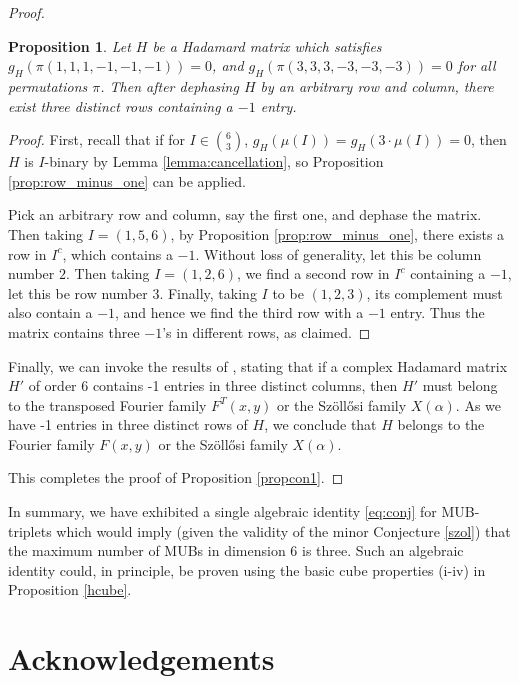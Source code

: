 \documentclass[12pt]{amsart}
\numberwithin{equation}{section}
\newcommand{\al}{\alpha}
\newtheorem{proposition}[fact]{Proposition}
\theoremstyle{definition}
\theoremstyle{remark}
\theoremstyle{remark}
\begin{document}
\begin{proof}
\begin{proposition}\label{tm1}
	Let $H$ be a Hadamard matrix which satisfies $g_H(\pi(1,1,1,-1,-1,-1))=0$, and
	$g_H(\pi(3,3,3,-3,-3,-3))=0$ for all permutations $\pi$. Then after dephasing $H$ by an arbitrary row and column, there exist three distinct rows containing a $-1$ entry.
\end{proposition}
\begin{proof}
	First, recall that if for $I\in\binom{6}{3}$, $g_H(\mu(I))=g_H(3\cdot \mu(I))=0$, then $H$ is $I$-binary by Lemma \ref{lemma:cancellation}, so Proposition \ref{prop:row_minus_one} can be applied.
	
	Pick an arbitrary row and column, say the first one, and dephase the matrix. Then taking $I=(1,5,6)$, by Proposition \ref{prop:row_minus_one}, there exists a row in $I^c$, which contains a $-1$. Without loss of generality, let this be column number $2$. Then taking $I=(1,2,6)$, we find a second row in $I^c$ containing a $-1$, let this be row number 3. Finally, taking $I$ to be $(1,2,3)$, its complement must also contain a $-1$, and hence we find the third row with a $-1$ entry. Thus the matrix contains three $-1$'s in different rows, as claimed.
\end{proof}

\medskip

Finally, we can invoke the results of \cite{ms}, stating that if a complex Hadamard matrix $H'$ of order 6 contains -1 entries in three distinct columns, then $H'$ must belong to the transposed Fourier family $F^T(x,y)$ or the Sz\"oll\H osi family $X(\al)$. As we have -1 entries in three distinct rows of $H$, we conclude that $H$ belongs to the Fourier family $F(x,y)$ or the Sz\"oll\H osi family $X(\al)$. 

\medskip 

This completes the proof of Proposition \ref{propcon1}.
\end{proof}

In summary, we have exhibited a single algebraic identity \eqref{eq:conj} for MUB-triplets which would imply (given the validity of the minor Conjecture \ref{szol}) that the maximum number of MUBs in dimension 6 is three. Such an algebraic identity could, in principle, be proven using the basic cube properties (i-iv) in Proposition \ref{hcube}.  

\section{Acknowledgements}
\end{document}
